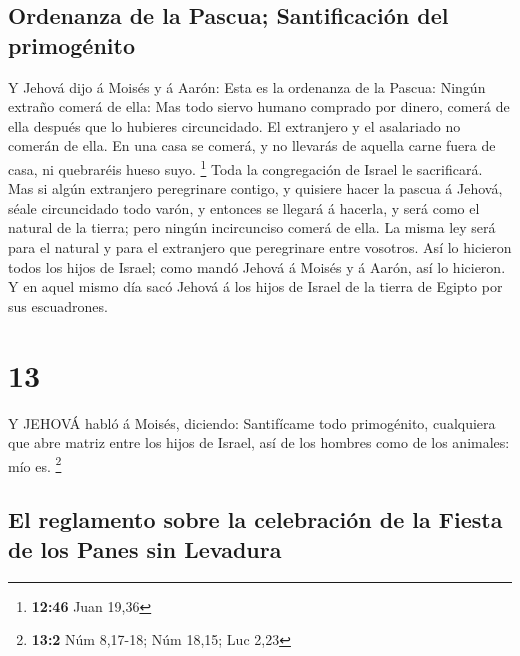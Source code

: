 \hypertarget{ordenanza-de-la-pascua-santificaciuxf3n-del-primoguxe9nito}{%
\subsection{Ordenanza de la Pascua; Santificación del
primogénito}\label{ordenanza-de-la-pascua-santificaciuxf3n-del-primoguxe9nito}}

 Y Jehová dijo á Moisés y á Aarón: Esta es la ordenanza de
la Pascua: Ningún extraño comerá de ella:  Mas todo siervo
humano comprado por dinero, comerá de ella después que lo hubieres
circuncidado.  El extranjero y el asalariado no comerán de
ella.  En una casa se comerá, y no llevarás de aquella
carne fuera de casa, ni quebraréis hueso suyo. \footnote{\textbf{12:46}
  Juan 19,36}  Toda la congregación de Israel le
sacrificará.  Mas si algún extranjero peregrinare contigo,
y quisiere hacer la pascua á Jehová, séale circuncidado todo varón, y
entonces se llegará á hacerla, y será como el natural de la tierra; pero
ningún incircunciso comerá de ella.  La misma ley será para
el natural y para el extranjero que peregrinare entre vosotros.
 Así lo hicieron todos los hijos de Israel; como mandó
Jehová á Moisés y á Aarón, así lo hicieron.  Y en aquel
mismo día sacó Jehová á los hijos de Israel de la tierra de Egipto por
sus escuadrones.

\hypertarget{section-12}{%
\section{13}\label{section-12}}

 Y JEHOVÁ habló á Moisés, diciendo:  Santifícame
todo primogénito, cualquiera que abre matriz entre los hijos de Israel,
así de los hombres como de los animales: mío es. \footnote{\textbf{13:2}
  Núm 8,17-18; Núm 18,15; Luc 2,23}

\hypertarget{el-reglamento-sobre-la-celebraciuxf3n-de-la-fiesta-de-los-panes-sin-levadura}{%
\subsection{El reglamento sobre la celebración de la Fiesta de los Panes
sin
Levadura}\label{el-reglamento-sobre-la-celebraciuxf3n-de-la-fiesta-de-los-panes-sin-levadura}}

